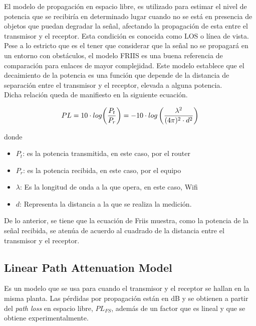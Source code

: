 El modelo de propagación en espacio libre, es utilizado para estimar el nivel de potencia que se recibiría en determinado lugar cuando no se está en presencia de objetos que puedan degradar la señal, afectando la propagación de esta entre el transmisor y el receptor. Esta condición es conocida como \ac{LOS} o línea de vista.\\

Pese a lo estricto que es el tener que considerar que la señal no se propagará en un entorno con obstáculos, el modelo FRIIS es una buena referencia de comparación para enlaces de mayor complejidad. Este modelo establece que el decaimiento de la potencia es una función que depende de la distancia de separación entre el transmisor y el receptor, elevada a alguna potencia.\\

Dicha relación queda de manifiesto en la siguiente ecuación.

\begin{equation}
PL = 10\cdot{log{\left(\dfrac{P_t}{P_r}\right)}} = -10\cdot{log\left(\dfrac{\lambda^2}{(4\pi)^2\cdot{d^2}}\right)}\\
\end{equation}

donde\\

\begin{itemize}
\item{$P_t$: es la potencia transmitida, en este caso, por el router}
\item{$P_r$: es la potencia recibida, en este caso, por el equipo}
\item{$\lambda$: Es la longitud de onda a la que opera, en este caso, Wifi}
\item{$d$: Representa la distancia a la que se realiza la medición.}
\end{itemize}

De lo anterior, se tiene que la ecuación de Friis muestra, como la potencia de la señal recibida, se atenúa de acuerdo al cuadrado de la distancia entre el transmisor y el receptor. \\

\subsection{Linear Path Attenuation Model} 

Es un modelo que se usa para cuando el transmisor y el receptor se hallan en la misma planta. Las pérdidas por propagación están en dB y se obtienen a partir del \textit{path loss} en espacio libre, $PL_{FS}$, además de un factor que es lineal y que se obtiene experimentalmente.\\

